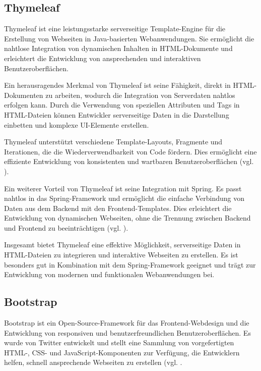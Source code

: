 \documentclass[fontsize=12pt,openright,oneside,paper=a4,BCOR=1cm]{scrbook}
\begin{document}
\subsection{Thymeleaf}

Thymeleaf ist eine leistungsstarke serverseitige Template-Engine für die Erstellung von Webseiten in Java-basierten Webanwendungen. Sie ermöglicht die nahtlose Integration von dynamischen Inhalten in HTML-Dokumente und erleichtert die Entwicklung von ansprechenden und interaktiven Benutzeroberflächen.

Ein herausragendes Merkmal von Thymeleaf ist seine Fähigkeit, direkt in HTML-Dokumenten zu arbeiten, wodurch die Integration von Serverdaten nahtlos erfolgen kann. Durch die Verwendung von speziellen Attributen und Tags in HTML-Dateien können Entwickler serverseitige Daten in die Darstellung einbetten und komplexe UI-Elemente erstellen.

Thymeleaf unterstützt verschiedene Template-Layouts, Fragmente und Iterationen, die die Wiederverwendbarkeit von Code fördern. Dies ermöglicht eine effiziente Entwicklung von konsistenten und wartbaren Benutzeroberflächen (vgl. \cite{thymeleaf}).

Ein weiterer Vorteil von Thymeleaf ist seine Integration mit Spring. Es passt nahtlos in das Spring-Framework und ermöglicht die einfache Verbindung von Daten aus dem Backend mit den Frontend-Templates. Dies erleichtert die Entwicklung von dynamischen Webseiten, ohne die Trennung zwischen Backend und Frontend zu beeinträchtigen (vgl. \cite{thymeleafspring}). 

Insgesamt bietet Thymeleaf eine effektive Möglichkeit, serverseitige Daten in HTML-Dateien zu integrieren und interaktive Webseiten zu erstellen. Es ist besonders gut in Kombination mit dem Spring-Framework geeignet und trägt zur Entwicklung von modernen und funktionalen Webanwendungen bei.

\subsection{Bootstrap}

Bootstrap ist ein Open-Source-Framework für das Frontend-Webdesign und die Entwicklung von responsiven und benutzerfreundlichen Benutzeroberflächen. Es wurde von Twitter entwickelt und stellt eine Sammlung von vorgefertigten HTML-, CSS- und JavaScript-Komponenten zur Verfügung, die Entwicklern helfen, schnell ansprechende Webseiten zu erstellen (vgl. \cite{twitterbootstrap}.
\end{document}
